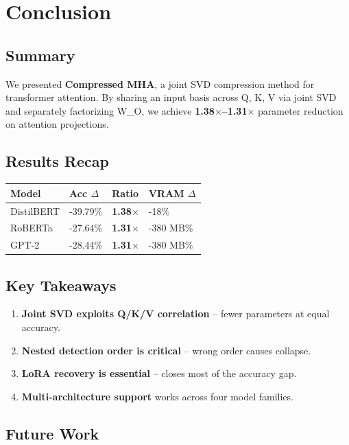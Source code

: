 \section{Conclusion}

\subsection{Summary}

We presented \textbf{Compressed MHA}, a joint SVD compression method for 
transformer attention. By sharing an input basis across Q, K, V via joint 
SVD and separately factorizing W\_O, we achieve \textbf{1.38$\times$--1.31$\times$} 
parameter reduction on attention projections.

\subsection{Results Recap}

\begin{table}[H]
\centering
\small
\begin{tabular}{llll}
\toprule
\textbf{Model} & \textbf{Acc $\Delta$} & \textbf{Ratio} & \textbf{VRAM $\Delta$} \\
\midrule
DistilBERT & -39.79\% & \textbf{1.38$\times$} & -18\% \\
RoBERTa & -27.64\% & \textbf{1.31$\times$} & -380 MB\% \\
GPT-2 & -28.44\% & \textbf{1.31$\times$} & -380 MB\% \\
\bottomrule
\end{tabular}
\end{table}

\subsection{Key Takeaways}

\begin{enumerate}
\item \textbf{Joint SVD exploits Q/K/V correlation} -- fewer parameters at equal
  accuracy.
\item \textbf{Nested detection order is critical} -- wrong order causes collapse.
\item \textbf{LoRA recovery is essential} -- closes most of the accuracy gap.
\item \textbf{Multi-architecture support} works across four model families.

\end{enumerate}
\subsection{Future Work}

